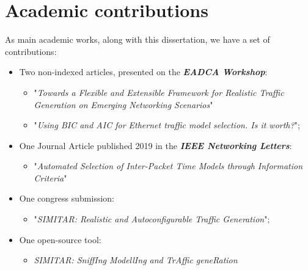 \chapter{Academic contributions}
\label{ap:publications}

As main academic works, along with this dissertation, we have a set of contributions:
\begin{itemize}
    \item Two non-indexed articles, presented on the \textit{\textbf{EADCA Workshop}}:
        \begin{itemize}
        \item "\textit{Towards a Flexible and Extensible Framework for Realistic Traffic
        Generation on Emerging Networking Scenarios}"\cite{eadca-demo}
        \item "\textit{Using BIC and AIC for Ethernet traffic model selection. Is it worth?}"\cite{eadca-aic-bic};
        \end{itemize}
    
    \item One Journal Article published 2019 in the \textit{\textbf{IEEE Networking Letters}}:
        \begin{itemize}
        \item "\textit{Automated Selection of Inter-Packet Time Models through Information Criteria}"\cite{aic-bic-paper}
        \end{itemize}
    \item One congress submission:
        \begin{itemize}
        \item  "\textit{SIMITAR: Realistic and Autoconfigurable Traffic Generation}";
        \end{itemize}
    \item One open-source tool: 
        \begin{itemize}
        \item \textit{SIMITAR: SniffIng ModellIng and TrAffic geneRation}\cite{projeto-github}
        \end{itemize}
\end{itemize}








%



